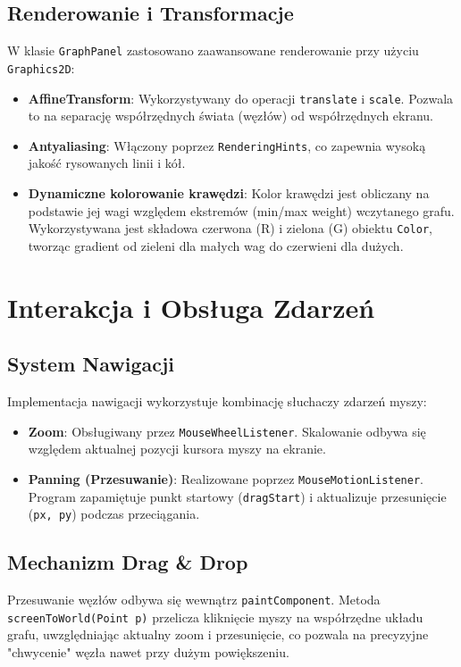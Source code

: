 \documentclass[12pt, a4paper]{article}
\begin{document}
\subsection{Renderowanie i Transformacje}
W klasie \texttt{GraphPanel} zastosowano zaawansowane renderowanie przy użyciu \texttt{Graphics2D}:
\begin{itemize}
    \item \textbf{AffineTransform}: Wykorzystywany do operacji \texttt{translate} i \texttt{scale}. Pozwala to na separację współrzędnych świata (węzłów) od współrzędnych ekranu.
    \item \textbf{Antyaliasing}: Włączony poprzez \texttt{RenderingHints}, co zapewnia wysoką jakość rysowanych linii i kół.
    \item \textbf{Dynamiczne kolorowanie krawędzi}: Kolor krawędzi jest obliczany na podstawie jej wagi względem ekstremów (min/max weight) wczytanego grafu. Wykorzystywana jest składowa czerwona (R) i zielona (G) obiektu \texttt{Color}, tworząc gradient od zieleni dla małych wag do czerwieni dla dużych.
\end{itemize}

\section{Interakcja i Obsługa Zdarzeń}

\subsection{System Nawigacji}
Implementacja nawigacji wykorzystuje kombinację słuchaczy zdarzeń myszy:
\begin{itemize}
    \item \textbf{Zoom}: Obsługiwany przez \texttt{MouseWheelListener}. Skalowanie odbywa się względem aktualnej pozycji kursora myszy na ekranie.
    \item \textbf{Panning (Przesuwanie)}: Realizowane poprzez \texttt{MouseMotionListener}. Program zapamiętuje punkt startowy (\texttt{dragStart}) i aktualizuje przesunięcie (\texttt{px, py}) podczas przeciągania.
\end{itemize}

\subsection{Mechanizm Drag \& Drop}
Przesuwanie węzłów odbywa się wewnątrz \texttt{paintComponent}. Metoda \texttt{screenToWorld(Point p)} przelicza kliknięcie myszy na współrzędne układu grafu, uwzględniając aktualny zoom i przesunięcie, co pozwala na precyzyjne "chwycenie" węzła nawet przy dużym powiększeniu.
\end{document}
